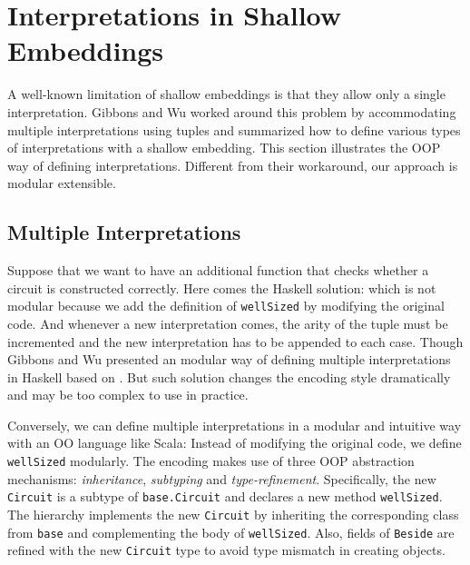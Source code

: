 \section{Interpretations in Shallow Embeddings}

\begin{comment}
Weixin writes this one.

Go over jeremy's examples, maybe having only 3 diagram 
constructs instead of 5 for space reasons.

Use five constructs to show extensibility.

Think of how to introduce our tool? Using the Jeremy's examples? 
or introducing before with some other examples?

\end{comment}

A well-known limitation of shallow embeddings is that they allow only a single
interpretation. Gibbons and Wu worked around this problem by accommodating
multiple interpretations using tuples and summarized how to define various types
of interpretations with a shallow embedding.
This section illustrates the OOP way of defining interpretations. Different from
their workaround, our approach is modular extensible.

\subsection{Multiple Interpretations}
Suppose that we want to have an additional function that checks whether a circuit is
constructed correctly. Here comes the Haskell solution:
which is not modular because we add the definition of \lstinline{wellSized} by
modifying the original code. And whenever a new interpretation comes,
the arity of the tuple must be incremented and the new interpretation has to be
appended to each case.
Though Gibbons and Wu presented an modular way of defining multiple
interpretations in Haskell based on
\cite{swierstra2008data}. But such solution changes the encoding style
dramatically and may be too complex to use in practice.

Conversely, we can define multiple interpretations in a
modular and intuitive way with an OO language like Scala:
Instead of modifying the original code, we define \lstinline{wellSized} modularly.
The encoding makes use of three OOP abstraction mechanisms:
\emph{inheritance}, \emph{subtyping} and \emph{type-refinement}.
Specifically, the new \lstinline{Circuit} is a subtype of
\lstinline{base.Circuit} and declares a new method \lstinline{wellSized}.
The hierarchy implements the new \lstinline{Circuit} by inheriting the corresponding class
from \lstinline{base} and
complementing the body of \lstinline{wellSized}.
Also, fields of \lstinline{Beside} are refined with the new \lstinline{Circuit}
type to avoid type mismatch in creating objects.


